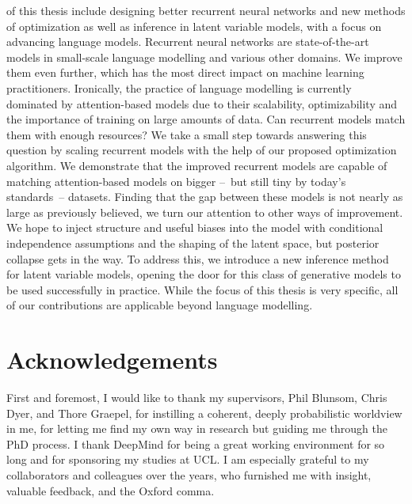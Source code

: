 \documentclass[12pt,a4paper,oneside]{book}
\begin{document}
of this thesis include designing better recurrent neural networks and new methods of optimization as well as inference in latent variable models, with a focus on advancing language models.
Recurrent neural networks are state-of-the-art models in small-scale language modelling and various other domains.
We improve them even further, which has the most direct impact on machine learning practitioners.
Ironically, the practice of language modelling is currently dominated by attention-based models due to their scalability, optimizability and the importance of training on large amounts of data.
Can recurrent models match them with enough resources?
We take a small step towards answering this question by scaling recurrent models with the help of our proposed optimization algorithm.
We demonstrate that the improved recurrent models are capable of matching attention-based models on bigger --~but still tiny by today's standards~-- datasets.
Finding that the gap between these models is not nearly as large as previously believed, we turn our attention to other ways of improvement.
We hope to inject structure and useful biases into the model with conditional independence assumptions and the shaping of the latent space, but posterior collapse gets in the way.
To address this, we introduce a new inference method for latent variable models, opening the door for this class of generative models to be used successfully in practice.
While the focus of this thesis is very specific, all of our contributions are applicable beyond language modelling.


\chapter*{Acknowledgements}

First and foremost, I would like to thank my supervisors, Phil Blunsom, Chris Dyer, and Thore Graepel, for instilling a coherent, deeply probabilistic worldview in me, for letting me find my own way in research but guiding me through the PhD process.
I thank DeepMind for being a great working environment for so long and for sponsoring my studies at UCL.
I am especially grateful to my collaborators and colleagues over the years, who furnished me with insight, valuable feedback, and the Oxford comma.\\
\end{document}
